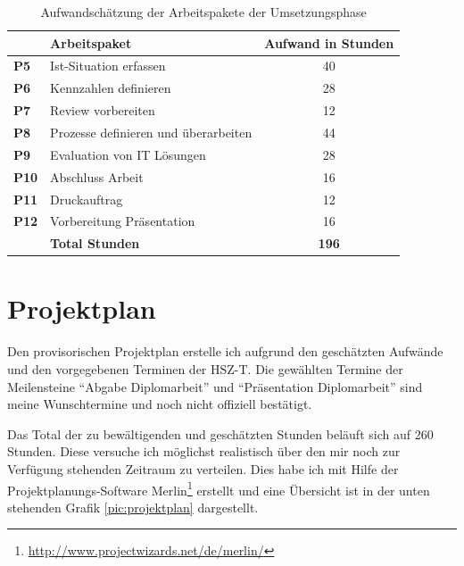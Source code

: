 \begin{table}[h]
\begin{center}
    \begin{tabular}{llc}
        \toprule & \textbf{Arbeitspaket} & \textbf{Aufwand in Stunden} \\
        \midrule \textbf{P5} & Ist-Situation erfassen & 40 \\
        \midrule \textbf{P6} & Kennzahlen definieren & 28 \\
        \midrule \textbf{P7} & Review vorbereiten & 12 \\
        \midrule \textbf{P8} & Prozesse definieren und überarbeiten & 44 \\
        \midrule \textbf{P9} & Evaluation von IT Lösungen & 28 \\
        \midrule \textbf{P10} & Abschluss Arbeit & 16 \\
        \midrule \textbf{P11} & Druckauftrag & 12 \\
        \midrule \textbf{P12} & Vorbereitung Präsentation & 16 \\
        \bottomrule & \textbf{Total Stunden} & \textbf{196} \\
        \bottomrule
    \end{tabular}
    \caption{Aufwandschätzung der Arbeitspakete der Umsetzungsphase}
    \label{tab:aufwand_umsetzungsphase}
\end{center}
\end{table}

\section{Projektplan}
Den provisorischen Projektplan erstelle ich aufgrund den geschätzten Aufwände
und den vorgegebenen Terminen der HSZ-T. Die gewählten Termine der Meilensteine
``Abgabe Diplomarbeit'' und ``Präsentation Diplomarbeit'' sind meine Wunschtermine
und noch nicht offiziell bestätigt.

Das Total der zu bewältigenden und geschätzten Stunden beläuft sich 
auf 260 Stunden. Diese versuche ich möglichst realistisch über den mir noch
zur Verfügung stehenden Zeitraum zu verteilen. Dies habe ich mit Hilfe der 
Projektplanungs-Software Merlin\footnote{\url{http://www.projectwizards.net/de/merlin/}} 
erstellt und eine Übersicht ist in der unten stehenden Grafik \ref{pic:projektplan} 
dargestellt.

